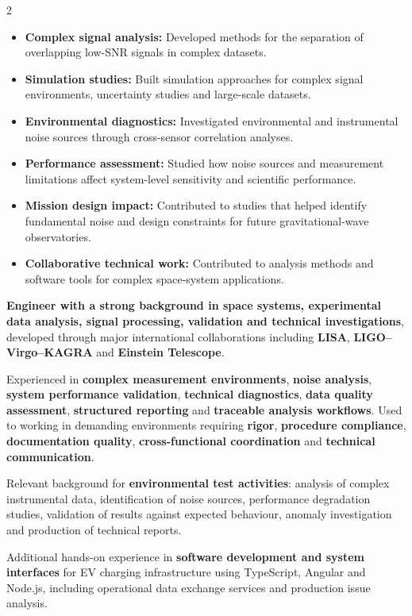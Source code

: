 \documentclass[8pt,a4paper,ragged2e,withhyper]{altacv}
\begin{document}
\begin{paracol}{2}
\begin{itemize}
\item \textbf{Complex signal analysis:} Developed methods for the separation of overlapping low-SNR signals in complex datasets.
\item \textbf{Simulation studies:} Built simulation approaches for complex signal environments, uncertainty studies and large-scale datasets.
\item \textbf{Environmental diagnostics:} Investigated environmental and instrumental noise sources through cross-sensor correlation analyses.
\item \textbf{Performance assessment:} Studied how noise sources and measurement limitations affect system-level sensitivity and scientific performance.
\item \textbf{Mission design impact:} Contributed to studies that helped identify fundamental noise and design constraints for future gravitational-wave observatories.
\item \textbf{Collaborative technical work:} Contributed to analysis methods and software tools for complex space-system applications.
\end{itemize}

\switchcolumn


\textbf{Engineer with a strong background in space systems, experimental data analysis, signal processing, validation and technical investigations}, developed through major international collaborations including \textbf{LISA}, \textbf{LIGO--Virgo--KAGRA} and \textbf{Einstein Telescope}.

Experienced in \textbf{complex measurement environments}, \textbf{noise analysis}, \textbf{system performance validation}, \textbf{technical diagnostics}, \textbf{data quality assessment}, \textbf{structured reporting} and \textbf{traceable analysis workflows}. Used to working in demanding environments requiring \textbf{rigor}, \textbf{procedure compliance}, \textbf{documentation quality}, \textbf{cross-functional coordination} and \textbf{technical communication}.

Relevant background for \textbf{environmental test activities}: analysis of complex instrumental data, identification of noise sources, performance degradation studies, validation of results against expected behaviour, anomaly investigation and production of technical reports.

Additional hands-on experience in \textbf{software development and system interfaces} for EV charging infrastructure using TypeScript, Angular and Node.js, including operational data exchange services and production issue analysis.


\end{paracol}
\end{document}
